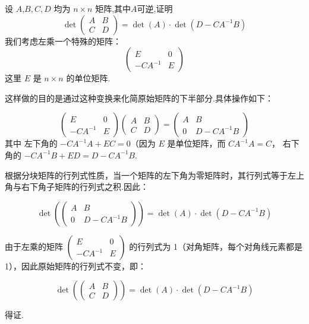 \begin{tcolorbox}[enhanced,colback=10,colframe=9,breakable,coltitle=green!25!black,title=2024]
  
设 $A$,$B,C,D$ 均为 $n\times n$ 矩阵,其中$A$可逆,证明
$$
\det\left(\begin{array}{cc}
A & B \\
C & D 
\end{array}\right) = \det(A) \cdot \det(D - CA^{-1}B)
$$
\tcblower
我们考虑左乘一个特殊的矩阵：
$$
\begin{pmatrix}
E & 0 \\
-CA^{-1} & E
\end{pmatrix}
$$
这里 $E$ 是 $n \times n$ 的单位矩阵.

这样做的目的是通过这种变换来化简原始矩阵的下半部分.具体操作如下：

$$
\begin{pmatrix}
E & 0 \\
-CA^{-1} & E
\end{pmatrix}
\begin{pmatrix}
A & B \\
C & D
\end{pmatrix}
=
\begin{pmatrix}
A & B \\
0 & D - CA^{-1}B
\end{pmatrix}
$$
其中 左下角的 $-CA^{-1}A + EC = 0$（因为 $E$ 是单位矩阵，而 $CA^{-1}A = C$， 右下角的 $-CA^{-1}B + ED = D - CA^{-1}B$.

根据分块矩阵的行列式性质，当一个矩阵的左下角为零矩阵时，其行列式等于左上角与右下角子矩阵的行列式之积.因此：

$$
\det\left(\begin{pmatrix}
A & B \\
0 & D - CA^{-1}B
\end{pmatrix}\right) = \det(A) \cdot \det(D - CA^{-1}B)
$$


由于左乘的矩阵 $\begin{pmatrix} E & 0 \\ -CA^{-1} & E \end{pmatrix}$ 的行列式为 1（对角矩阵，每个对角线元素都是 1），因此原始矩阵的行列式不变，即：

$$
\det\left(\begin{pmatrix}
A & B \\
C & D
\end{pmatrix}\right) = \det(A) \cdot \det(D - CA^{-1}B)
$$

得证.

\end{tcolorbox}



